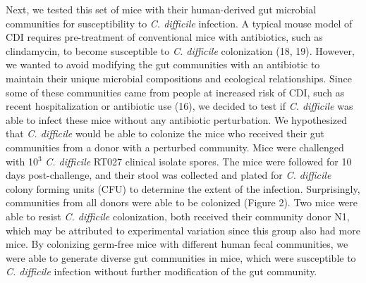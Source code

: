 \documentclass[
  12pt,
]{article}
\begin{document}
Next, we tested this set of mice with their human-derived gut microbial
communities for susceptibility to \emph{C. difficile} infection. A
typical mouse model of CDI requires pre-treatment of conventional mice
with antibiotics, such as clindamycin, to become susceptible to \emph{C.
difficile} colonization (18, 19). However, we wanted to avoid modifying
the gut communities with an antibiotic to maintain their unique
microbial compositions and ecological relationships. Since some of these
communities came from people at increased risk of CDI, such as recent
hospitalization or antibiotic use (16), we decided to test if \emph{C.
difficile} was able to infect these mice without any antibiotic
perturbation. We hypothesized that \emph{C. difficile} would be able to
colonize the mice who received their gut communities from a donor with a
perturbed community. Mice were challenged with 10\(^{3}\) \emph{C.
difficile} RT027 clinical isolate spores. The mice were followed for 10
days post-challenge, and their stool was collected and plated for
\emph{C. difficile} colony forming units (CFU) to determine the extent
of the infection. Surprisingly, communities from all donors were able to
be colonized (Figure 2). Two mice were able to resist \emph{C.
difficile} colonization, both received their community donor N1, which
may be attributed to experimental variation since this group also had
more mice. By colonizing germ-free mice with different human fecal
communities, we were able to generate diverse gut communities in mice,
which were susceptible to \emph{C. difficile} infection without further
modification of the gut community.
\end{document}
